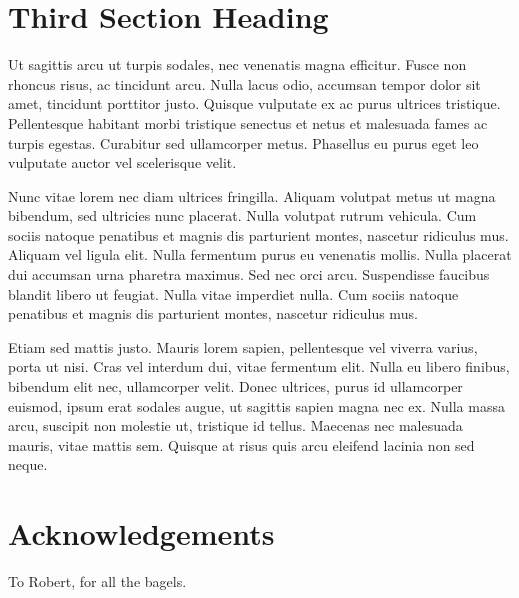 \documentclass{acmsiggraph}
\begin{document}
\section{Third Section Heading}

Ut sagittis arcu ut turpis sodales, nec venenatis magna efficitur. Fusce non rhoncus risus, ac tincidunt arcu. Nulla lacus odio, accumsan tempor dolor sit amet, tincidunt porttitor justo. Quisque vulputate ex ac purus ultrices tristique. Pellentesque habitant morbi tristique senectus et netus et malesuada fames ac turpis egestas. Curabitur sed ullamcorper metus. Phasellus eu purus eget leo vulputate auctor vel scelerisque velit.

Nunc vitae lorem nec diam ultrices fringilla. Aliquam volutpat metus ut magna bibendum, sed ultricies nunc placerat. Nulla volutpat rutrum vehicula. Cum sociis natoque penatibus et magnis dis parturient montes, nascetur ridiculus mus. Aliquam vel ligula elit. Nulla fermentum purus eu venenatis mollis. Nulla placerat dui accumsan urna pharetra maximus. Sed nec orci arcu. Suspendisse faucibus blandit libero ut feugiat. Nulla vitae imperdiet nulla. Cum sociis natoque penatibus et magnis dis parturient montes, nascetur ridiculus mus.

Etiam sed mattis justo. Mauris lorem sapien, pellentesque vel viverra varius, porta ut nisi. Cras vel interdum dui, vitae fermentum elit. Nulla eu libero finibus, bibendum elit nec, ullamcorper velit. Donec ultrices, purus id ullamcorper euismod, ipsum erat sodales augue, ut sagittis sapien magna nec ex. Nulla massa arcu, suscipit non molestie ut, tristique id tellus. Maecenas nec malesuada mauris, vitae mattis sem. Quisque at risus quis arcu eleifend lacinia non sed neque.

\section*{Acknowledgements}

To Robert, for all the bagels.


\nocite{*}

\end{document}
